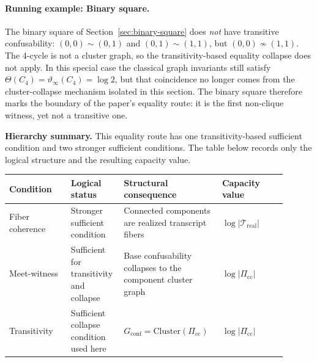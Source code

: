 \paragraph{Running example: Binary square.}
The binary square of Section~\ref{sec:binary-square} does \emph{not} have transitive confusability: $(0,0) \sim (0,1)$ and $(0,1) \sim (1,1)$, but $(0,0) \not\sim (1,1)$. The 4-cycle is not a cluster graph, so the transitivity-based equality collapse does not apply. In this special case the classical graph invariants still satisfy $\Theta(C_4)=\vartheta_\infty(C_4)=\log 2$, but that coincidence no longer comes from the cluster-collapse mechanism isolated in this section. The binary square therefore marks the boundary of the paper's equality route: it is the first non-clique witness, yet not a transitive one.

\medskip
\noindent\textbf{Hierarchy summary.} This equality route has one transitivity-based sufficient condition and two stronger sufficient conditions. The table below records only the logical structure and the resulting capacity value.

\begingroup
\small
\setlength{\tabcolsep}{4pt}
\renewcommand{\arraystretch}{1.1}
\begin{center}
\begin{tabularx}{0.98\linewidth}{@{}>{\RaggedRight\arraybackslash}p{0.21\linewidth}>{\RaggedRight\arraybackslash}p{0.16\linewidth}>{\RaggedRight\arraybackslash}p{0.31\linewidth}>{\RaggedRight\arraybackslash}p{0.22\linewidth}@{}}
\toprule
\textbf{Condition} & \textbf{Logical status} & \textbf{Structural consequence} & \textbf{Capacity value} \\
\midrule
Fiber coherence & Stronger sufficient condition & Connected components are realized transcript fibers & $\log |\mathcal T_{\mathrm{real}}|$ \\
Meet-witness & Sufficient for transitivity and collapse & Base confusability collapses to the component cluster graph & $\log |\Pi_{\mathrm{cc}}|$ \\
Transitivity & Sufficient collapse condition used here & $G_{\mathrm{conf}}=\mathrm{Cluster}(\Pi_{\mathrm{cc}})$ & $\log |\Pi_{\mathrm{cc}}|$ \\
\bottomrule
\end{tabularx}
\end{center}
\endgroup
